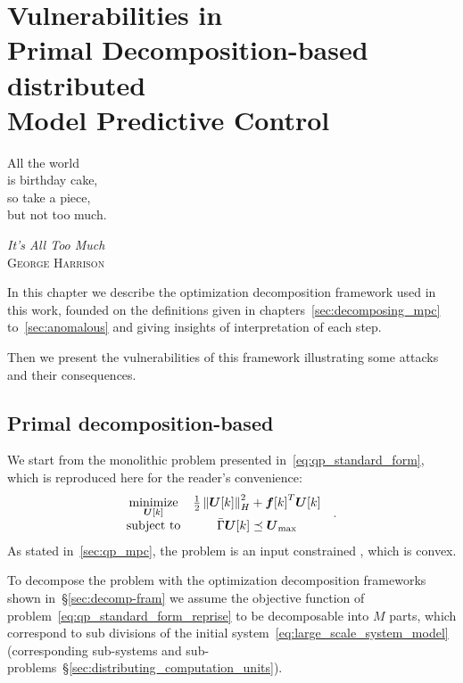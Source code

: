\documentclass[../main.tex]{subfiles}
\begin{document}
\chapter[Vulnerabilities in Primal Decomposition-based dMPC]{Vulnerabilities in \\Primal Decomposition-based \\distributed \\Model Predictive Control}\label{sec:primal_decomposition}
\epigraph{\centering All the world\\ is birthday cake,\\ so take a piece, \\but not too much.}
{\textit{It's All Too Much}\\\textsc{George Harrison}}

In this chapter we describe the optimization decomposition framework used in this work, founded on the definitions given in chapters~\ref{sec:decomposing_mpc} to~\ref{sec:anomalous} and giving insights of interpretation of each step.

Then we present the vulnerabilities of this framework illustrating some attacks and their consequences.

\minitoc

\section{Primal decomposition-based \dmpc{}}\label{sec:decomposition_PD}

We start from the monolithic \mpc{} problem presented in~\eqref{eq:qp_standard_form}, which is reproduced here for the reader's convenience:
\begin{equation}
  \label{eq:qp_standard_form_reprise}
  \begin{aligned}
    \begin{matrix}
      \underset{\boldsymbol{U}[k]}{\mathrm{minimize}} &
      \frac{1}{2}\left\lVert\boldsymbol{U}[k]\right\rVert^{2}_{H} + {\boldsymbol{f}[k]}^{T}\boldsymbol{U}[k] &\\
      \mathrm{subject~ to} &
\bar{\Gamma}\boldsymbol{U}[k]\preceq {\boldsymbol{U}}_{\text{max}}
    \end{matrix}
  \end{aligned}.
\end{equation}
As stated in~\ref{sec:qp_mpc}, the problem is an input constrained \qp{}, which is convex.

To decompose the problem with the optimization decomposition frameworks shown in~\S\ref{sec:decomp-fram} we assume the objective function of problem~\eqref{eq:qp_standard_form_reprise} to be decomposable into $M$ parts, which correspond to sub divisions of the initial system~\eqref{eq:large_scale_system_model} (corresponding sub-systems and sub-problems~\S\ref{sec:distributing_computation_units}).
\end{document}
